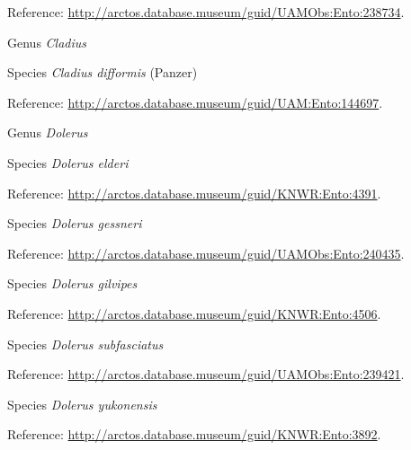 \documentclass[9pt, article]{memoir}
\begin{document}
\begin{multicols}{2}
\vspace{6pt}Reference: 
\url{http://arctos.database.museum/guid/UAMObs:Ento:238734}.

\vspace{6pt}\noindent\hspace{30pt}Genus \textit{Cladius}


\vspace{6pt}\noindent\hspace{36pt}Species \textit{Cladius difformis} (Panzer)


\vspace{6pt}Reference: 
\url{http://arctos.database.museum/guid/UAM:Ento:144697}.

\vspace{6pt}\noindent\hspace{30pt}Genus \textit{Dolerus}


\vspace{6pt}\noindent\hspace{36pt}Species \textit{Dolerus elderi}


\vspace{6pt}Reference: 
\url{http://arctos.database.museum/guid/KNWR:Ento:4391}.

\vspace{6pt}\noindent\hspace{36pt}Species \textit{Dolerus gessneri}


\vspace{6pt}Reference: 
\url{http://arctos.database.museum/guid/UAMObs:Ento:240435}.

\vspace{6pt}\noindent\hspace{36pt}Species \textit{Dolerus gilvipes}


\vspace{6pt}Reference: 
\url{http://arctos.database.museum/guid/KNWR:Ento:4506}.

\vspace{6pt}\noindent\hspace{36pt}Species \textit{Dolerus subfasciatus}


\vspace{6pt}Reference: 
\url{http://arctos.database.museum/guid/UAMObs:Ento:239421}.

\vspace{6pt}\noindent\hspace{36pt}Species \textit{Dolerus yukonensis}


\vspace{6pt}Reference: 
\url{http://arctos.database.museum/guid/KNWR:Ento:3892}.


\end{multicols}
\end{document}
